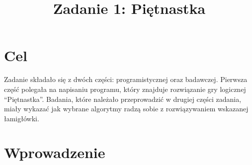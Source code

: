 \documentclass{classrep}
\author{
  \studentinfo{Paweł Guzek}{224304} \and
  \studentinfo{Krzysztof Szcześniak}{224434} \and
  \studentinfo{Michał Maksajda}{224369} \and
  \studentinfo{Dominik Kasierski}{224323}  
}
\title{Zadanie 1: Piętnastka}
\begin{document}
\maketitle
\pagebreak

\section{Cel}
{\color{black}
Zadanie składało się z dwóch części: programistycznej oraz badawczej. Pierwsza część polegała na napisaniu programu, który znajduje rozwiązanie gry logicznej “Piętnastka”. Badania, które należało przeprowadzić w drugiej części zadania, miały wykazać jak wybrane algorytmy radzą sobie z rozwiązywaniem wskazanej łamigłówki.
}


\section{Wprowadzenie}
\end{document}
